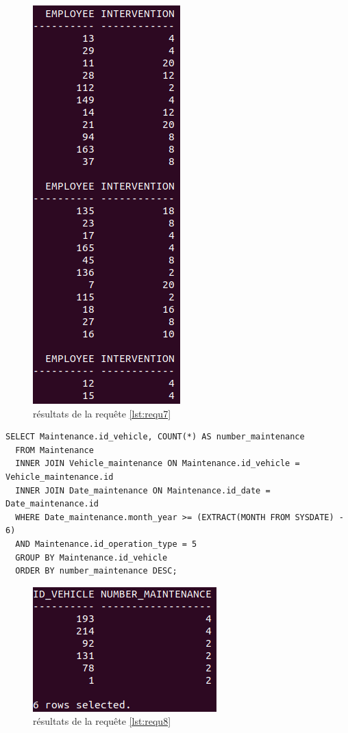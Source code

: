 \documentclass[a4paper,12pt]{report}
\begin{document}
\begin{figure}[!ht]
  \centering
  \includegraphics[scale=0.5]{images/requetes_analytiques/requ7.png}
  \caption{résultats de la requête \ref{lst:requ7}}
\end{figure}

\newpage

\begin{lstlisting}[caption={le nombre total de maintenances effectuées par véhicule pour les 6 dernier mois.}, label={lst:requ8}]
  SELECT Maintenance.id_vehicle, COUNT(*) AS number_maintenance
  FROM Maintenance
  INNER JOIN Vehicle_maintenance ON Maintenance.id_vehicle = Vehicle_maintenance.id
  INNER JOIN Date_maintenance ON Maintenance.id_date = Date_maintenance.id
  WHERE Date_maintenance.month_year >= (EXTRACT(MONTH FROM SYSDATE) - 6)
  AND Maintenance.id_operation_type = 5
  GROUP BY Maintenance.id_vehicle
  ORDER BY number_maintenance DESC;
\end{lstlisting}

\begin{figure}[!ht]
  \centering
  \includegraphics[scale=0.5]{images/requetes_analytiques/requ8.png}
  \caption{résultats de la requête \ref{lst:requ8}}
\end{figure}
\end{document}
